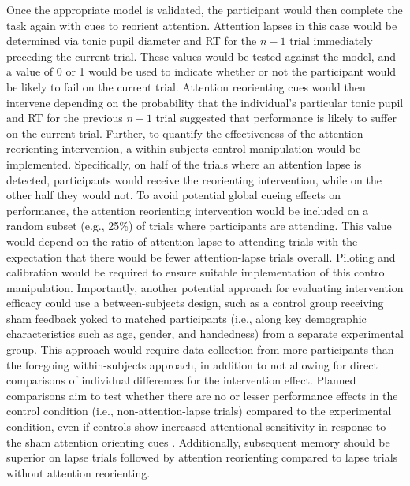 Once the appropriate model is validated, the participant would then complete the task again with cues to reorient attention. Attention lapses in this case would be determined via tonic pupil diameter and RT for the $n - 1$ trial immediately preceding the current trial. These values would be tested against the model, and a value of 0 or 1 would be used to indicate whether or not the participant would be likely to fail on the current trial. Attention reorienting cues would then intervene depending on the probability that the individual's particular tonic pupil and RT for the previous $n - 1$ trial suggested that performance is likely to suffer on the current trial. Further, to quantify the effectiveness of the attention reorienting intervention, a within-subjects control manipulation would be implemented. Specifically, on half of the trials where an attention lapse is detected, participants would receive the reorienting intervention, while on the other half they would not. To avoid potential global cueing effects on performance, the attention reorienting intervention would be included on a random subset (e.g., 25\%) of trials where participants are attending. This value would depend on the ratio of attention-lapse to attending trials with the expectation that there would be fewer attention-lapse trials overall. Piloting and calibration would be required to ensure suitable implementation of this control manipulation. Importantly, another potential approach for evaluating intervention efficacy could use a between-subjects design, such as a control group receiving sham feedback yoked to matched participants (i.e., along key demographic characteristics such as age, gender, and handedness) from a separate experimental group. This approach would require data collection from more participants than the foregoing within-subjects approach, in addition to not allowing for direct comparisons of individual differences for the intervention effect. Planned comparisons aim to test whether there are no or lesser performance effects in the control condition (i.e., non-attention-lapse trials) compared to the experimental condition, even if controls show increased attentional sensitivity in response to the sham attention orienting cues \parencite[see][]{debettencourt2015closed}. Additionally, subsequent memory should be superior on lapse trials followed by attention reorienting compared to lapse trials without attention reorienting.

